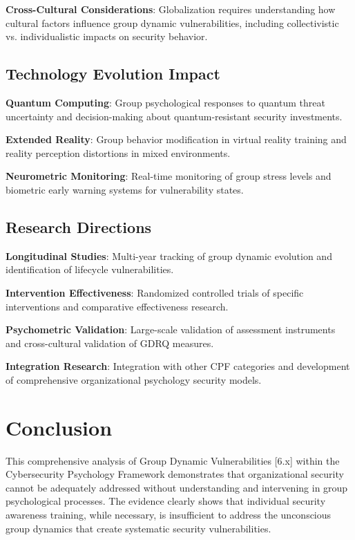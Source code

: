 \documentclass[11pt,a4paper]{article}
\begin{document}
\textbf{Cross-Cultural Considerations}: Globalization requires understanding how cultural factors influence group dynamic vulnerabilities, including collectivistic vs. individualistic impacts on security behavior.

\subsection{Technology Evolution Impact}

\textbf{Quantum Computing}: Group psychological responses to quantum threat uncertainty and decision-making about quantum-resistant security investments.

\textbf{Extended Reality}: Group behavior modification in virtual reality training and reality perception distortions in mixed environments.

\textbf{Neurometric Monitoring}: Real-time monitoring of group stress levels and biometric early warning systems for vulnerability states.

\subsection{Research Directions}

\textbf{Longitudinal Studies}: Multi-year tracking of group dynamic evolution and identification of lifecycle vulnerabilities.

\textbf{Intervention Effectiveness}: Randomized controlled trials of specific interventions and comparative effectiveness research.

\textbf{Psychometric Validation}: Large-scale validation of assessment instruments and cross-cultural validation of GDRQ measures.

\textbf{Integration Research}: Integration with other CPF categories and development of comprehensive organizational psychology security models.

\section{Conclusion}

This comprehensive analysis of Group Dynamic Vulnerabilities [6.x] within the Cybersecurity Psychology Framework demonstrates that organizational security cannot be adequately addressed without understanding and intervening in group psychological processes. The evidence clearly shows that individual security awareness training, while necessary, is insufficient to address the unconscious group dynamics that create systematic security vulnerabilities.
\end{document}
